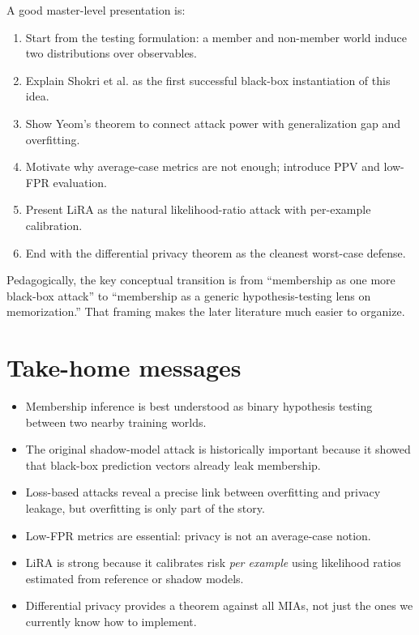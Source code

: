 \documentclass[11pt]{article}
\theoremstyle{definition}
\newcommand{\1}{\mathbf{1}}
\newcommand{\PPV}{\mathrm{PPV}}
\begin{document}
A good master-level presentation is:
\begin{enumerate}
    \item Start from the testing formulation: a member and non-member world induce two distributions over observables.
    \item Explain Shokri et al. as the first successful black-box instantiation of this idea.
    \item Show Yeom's theorem to connect attack power with generalization gap and overfitting.
    \item Motivate why average-case metrics are not enough; introduce $\PPV$ and low-FPR evaluation.
    \item Present LiRA as the natural likelihood-ratio attack with per-example calibration.
    \item End with the differential privacy theorem as the cleanest worst-case defense.
\end{enumerate}

Pedagogically, the key conceptual transition is from ``membership as one more black-box attack'' to ``membership as a generic hypothesis-testing lens on memorization.'' That framing makes the later literature much easier to organize.

\section{Take-home messages}

\begin{itemize}
    \item Membership inference is best understood as binary hypothesis testing between two nearby training worlds.
    \item The original shadow-model attack is historically important because it showed that black-box prediction vectors already leak membership.
    \item Loss-based attacks reveal a precise link between overfitting and privacy leakage, but overfitting is only part of the story.
    \item Low-FPR metrics are essential: privacy is not an average-case notion.
    \item LiRA is strong because it calibrates risk \emph{per example} using likelihood ratios estimated from reference or shadow models.
    \item Differential privacy provides a theorem against all MIAs, not just the ones we currently know how to implement.
\end{itemize}
\end{document}
